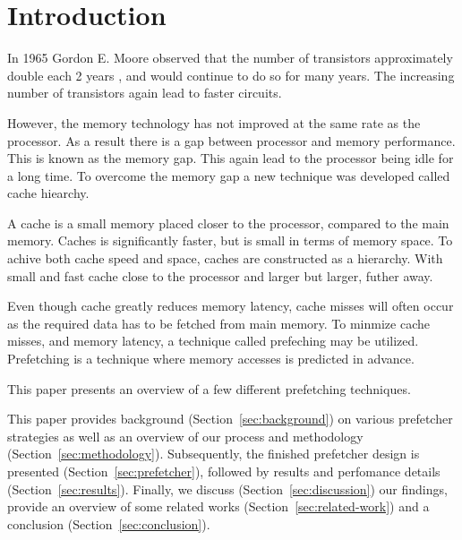 \section{Introduction}
\label{sec:introduction}

In 1965 Gordon E. Moore observed that the number of transistors approximately double each 2 years \cite{bib:moore},
and would continue to do so for many years.
The increasing number of transistors again lead to faster circuits.

However, the memory technology has not improved at the same rate as the processor.
As a result there is a gap between processor and memory performance.
This is known as the memory gap.
This again lead to the processor being idle for a long time.
To overcome the memory gap a new technique was developed called cache hiearchy.

A cache is a small memory placed closer to the processor, compared to the main memory.
Caches is significantly faster, but is small in terms of memory space.
To achive both cache speed and space, caches are constructed as a hierarchy.
With small and fast cache close to the processor and larger but larger, futher away.

Even though cache greatly reduces memory latency, cache misses will often occur as the required data has to be fetched from main memory.
To minmize cache misses, and memory latency, a technique called prefeching may be utilized.
Prefetching is a technique where memory accesses is predicted in advance.

This paper presents an overview of a few different prefetching techniques.

This paper provides background (Section~\ref{sec:background}) on various prefetcher strategies as well as an overview of our process and methodology (Section~\ref{sec:methodology}).
Subsequently, the finished prefetcher design is presented (Section~\ref{sec:prefetcher}), followed by results and perfomance details (Section~\ref{sec:results}).
Finally, we discuss (Section~\ref{sec:discussion}) our findings,
provide an overview of some related works (Section~\ref{sec:related-work}) and a conclusion (Section~\ref{sec:conclusion}).


